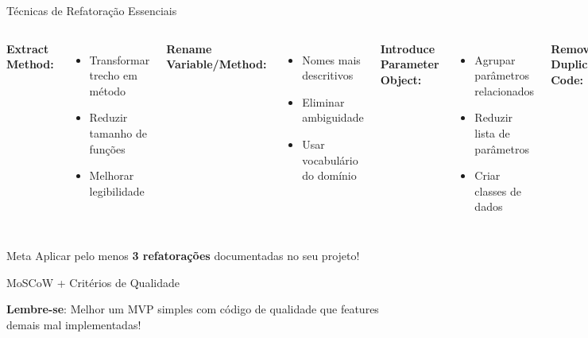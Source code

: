 \documentclass[10pt]{beamer}
\begin{document}
\begin{frame}{Técnicas de Refatoração Essenciais}
\begin{columns}[c]
\textbf{Extract Method:}
\begin{itemize}
    \item Transformar trecho em método
    \item Reduzir tamanho de funções
    \item Melhorar legibilidade
\end{itemize}

\textbf{Rename Variable/Method:}
\begin{itemize}
    \item Nomes mais descritivos
    \item Eliminar ambiguidade
    \item Usar vocabulário do domínio
\end{itemize}

\textbf{Introduce Parameter Object:}
\begin{itemize}
    \item Agrupar parâmetros relacionados
    \item Reduzir lista de parâmetros
    \item Criar classes de dados
\end{itemize}

\textbf{Remove Duplicate Code:}
\begin{itemize}
    \item Extrair código comum
    \item Criar funções reutilizáveis
    \item Manter consistência
\end{itemize}
\end{columns}

\vspace{0.3cm}
\begin{exampleblock}{Meta}
Aplicar pelo menos \textbf{3 refatorações} documentadas no seu projeto!
\end{exampleblock}
\end{frame}

\begin{frame}{MoSCoW + Critérios de Qualidade}
\centering
{}

\vspace{0.5cm}
\textbf{Lembre-se}: Melhor um MVP simples com código de qualidade que features demais mal implementadas!
\end{frame}
\end{document}
